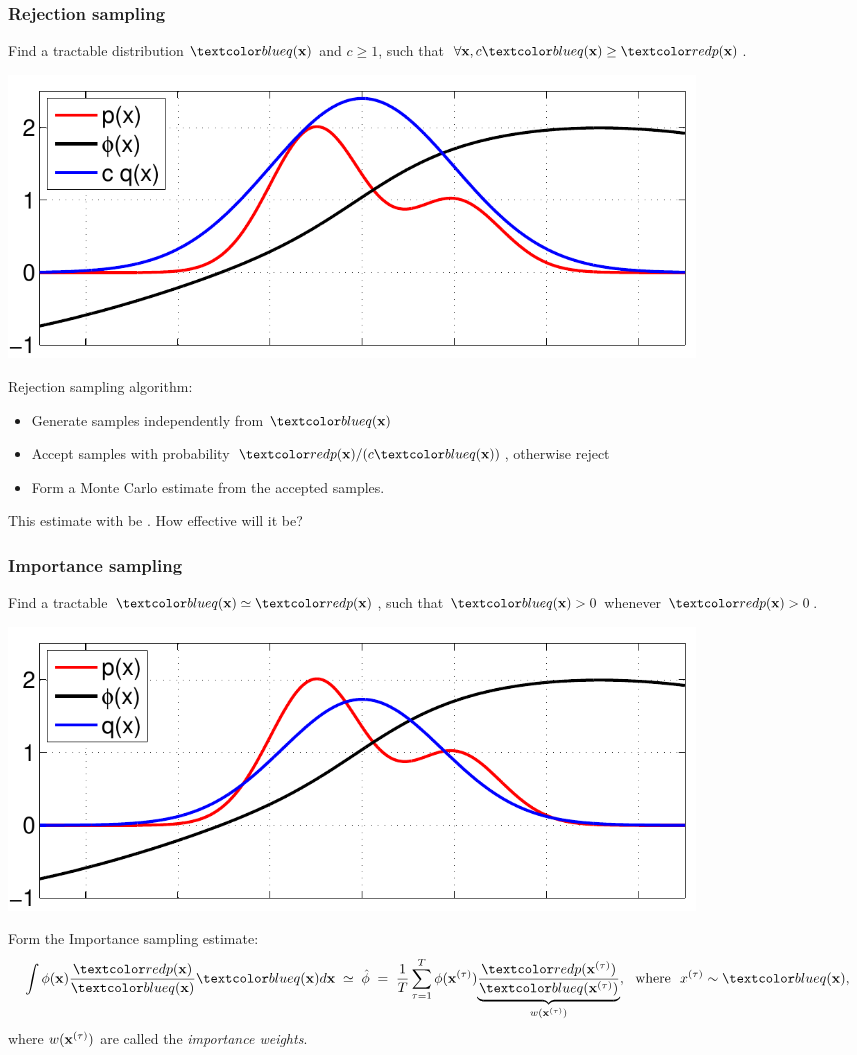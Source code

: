 \begin{frame}
\frametitle{Rejection sampling}

Find a tractable distribution $\Blue{q(\bfx)}$ and $c\geq 1$, such that $\forall\bfx, c\Blue{q(\bfx)}\geq\Red{p(\bfx)}$.
\begin{center}
\includegraphics[width=0.8\textwidth]{mc2}
\end{center}
Rejection sampling algorithm:
\begin{itemize}
\item Generate samples independently from $\Blue{q(\bfx)}$
\item Accept samples with probability $\Red{p(\bfx)}/(c\Blue{q(\bfx)})$, otherwise reject
\item Form a Monte Carlo estimate from the accepted samples.
\end{itemize}
This estimate with be . How effective will it be?
\end{frame}

\begin{frame}
\frametitle{Importance sampling}

Find a tractable $\Blue{q(\bfx)}\simeq\Red{p(\bfx)}$, such that
$\Blue{q(\bfx)}>0$ whenever $\Red{p(\bfx)}>0$.
\begin{center}
\includegraphics[width=0.8\textwidth]{mc3}
\end{center}
Form the Importance sampling estimate:
\[
\int \phi(\bfx)\frac{\Red{p(\bfx)}}{\Blue{q(\bfx)}}\Blue{q(\bfx)}d\bfx\;
\simeq\;\hat\phi\;=\;\frac{1}{T}\sum_{\tau=1}^T\phi(\bfx^{(\tau)})
\underset{w(\bfx^{(\tau)})}{\underbrace{\frac{\Red{p(\bfx^{(\tau)})}}{\Blue{q(\bfx^{(\tau)})}}}}, \text{\ \ where\ \ }
x^{(\tau)}\sim\Blue{q(\bfx)},
\]
where $w(\mathbf x^{(\tau)})$ are called the \emph{importance weights}.
\end{frame}

